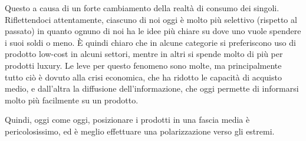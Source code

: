 Questo a causa di un forte cambiamento della realtà di consumo dei singoli.
Riflettendoci attentamente, ciascuno di noi oggi è molto più selettivo
(rispetto al passato) in quanto ognuno di noi ha le idee più chiare su dove uno
vuole spendere i suoi soldi o meno. È quindi chiaro che in alcune categorie si
preferiscono uso di prodotto low-cost in alcuni settori, mentre in altri si
spende molto di più per prodotti luxury. Le leve per questo fenomeno sono
molte, ma principalmente tutto ciò è dovuto alla crisi economica, che ha
ridotto le capacità di acquisto medio, e dall'altra la diffusione
dell'informazione, che oggi permette di informarsi molto più facilmente su un
prodotto.

Quindi, oggi come oggi, posizionare i prodotti in una fascia media è
pericolosissimo, ed è meglio effettuare una polarizzazione verso gli estremi.
